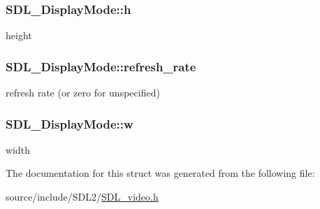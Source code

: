 \subsubsection[{h}]{ S\+D\+L\+\_\+\+Display\+Mode\+::h}\label{struct_s_d_l___display_mode_a0d9eabed50a560ed553af772c26632d7}
height \hypertarget{struct_s_d_l___display_mode_ad1b5783c9b292ebf24ad4e0e7a98e540}{}
\subsubsection[{refresh\+\_\+rate}]{ S\+D\+L\+\_\+\+Display\+Mode\+::refresh\+\_\+rate}\label{struct_s_d_l___display_mode_ad1b5783c9b292ebf24ad4e0e7a98e540}
refresh rate (or zero for unspecified) \hypertarget{struct_s_d_l___display_mode_a504bb5e21950b719a0df43be51199046}{}
\subsubsection[{w}]{ S\+D\+L\+\_\+\+Display\+Mode\+::w}\label{struct_s_d_l___display_mode_a504bb5e21950b719a0df43be51199046}
width 

The documentation for this struct was generated from the following file\+:\begin{DoxyCompactItemize}
\item 
source/include/\+S\+D\+L2/\hyperlink{_s_d_l__video_8h}{S\+D\+L\+\_\+video.\+h}\end{DoxyCompactItemize}

